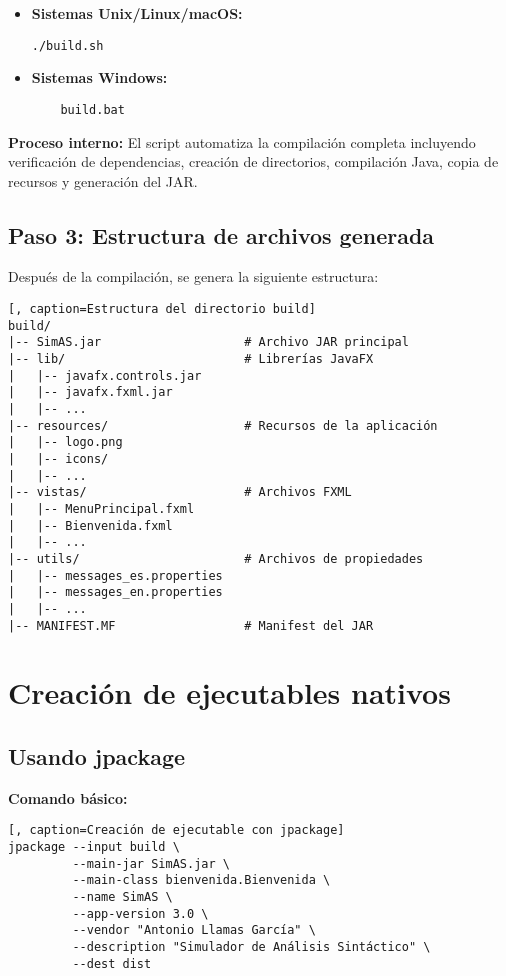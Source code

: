 \begin{itemize}
    \item \textbf{Sistemas Unix/Linux/macOS:}
    \begin{lstlisting}[]
    ./build.sh
    \end{lstlisting}

    \item \textbf{Sistemas Windows:}
    \begin{lstlisting}
    build.bat
    \end{lstlisting}
\end{itemize}

\textbf{Proceso interno:} El script automatiza la compilación completa incluyendo verificación de dependencias, creación de directorios, compilación Java, copia de recursos y generación del JAR.

\subsection{Paso 3: Estructura de archivos generada}

Después de la compilación, se genera la siguiente estructura:

\begin{lstlisting}[, caption=Estructura del directorio build]
build/
|-- SimAS.jar                    # Archivo JAR principal
|-- lib/                         # Librerías JavaFX
|   |-- javafx.controls.jar
|   |-- javafx.fxml.jar
|   |-- ...
|-- resources/                   # Recursos de la aplicación
|   |-- logo.png
|   |-- icons/
|   |-- ...
|-- vistas/                      # Archivos FXML
|   |-- MenuPrincipal.fxml
|   |-- Bienvenida.fxml
|   |-- ...
|-- utils/                       # Archivos de propiedades
|   |-- messages_es.properties
|   |-- messages_en.properties
|   |-- ...
|-- MANIFEST.MF                  # Manifest del JAR
\end{lstlisting}

\section{Creación de ejecutables nativos}

\subsection{Usando jpackage}

\textbf{Comando básico:}
\begin{lstlisting}[, caption=Creación de ejecutable con jpackage]
jpackage --input build \
         --main-jar SimAS.jar \
         --main-class bienvenida.Bienvenida \
         --name SimAS \
         --app-version 3.0 \
         --vendor "Antonio Llamas García" \
         --description "Simulador de Análisis Sintáctico" \
         --dest dist
\end{lstlisting}

